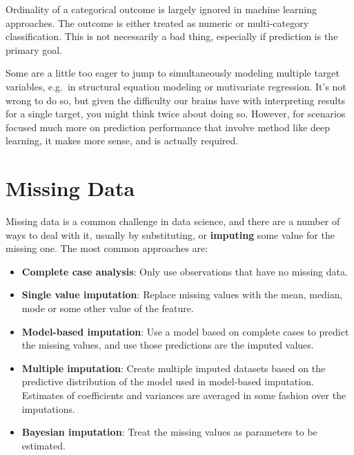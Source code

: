 \documentclass[
  letterpaper,
]{krantz}
\providecommand{\tightlist}{%
  \setlength{\itemsep}{0pt}\setlength{\parskip}{0pt}}\usepackage{longtable,booktabs,array}
\begin{document}
Ordinality of a categorical outcome is largely ignored in machine
learning approaches. The outcome is either treated as numeric or
multi-category classification. This is not necessarily a bad thing,
especially if prediction is the primary goal.

\begin{tcolorbox}[enhanced jigsaw, toprule=.15mm, colback=white, breakable, rightrule=.15mm, arc=.35mm, bottomrule=.15mm, opacityback=0, colframe=quarto-callout-tip-color-frame, leftrule=.75mm, left=2mm]
\begin{minipage}[t]{5.5mm}
\textcolor{quarto-callout-tip-color}{\faLightbulb}
\end{minipage}%
\begin{minipage}[t]{\textwidth - 5.5mm}

Some are a little too eager to jump to simultaneously modeling multiple
target variables, e.g.~in structural equation modeling or mutivariate
regression. It's not wrong to do so, but given the difficulty our brains
have with interpreting results for a single target, you might think
twice about doing so. However, for scenarios focused much more on
prediction performance that involve method like deep learning, it makes
more sense, and is actually required.

\end{minipage}%
\end{tcolorbox}

\section{Missing Data}\label{sec-missing-data}

Missing data is a common challenge in data science, and there are a
number of ways to deal with it, usually by substituting, or
\textbf{imputing} some value for the missing one. The most common
approaches are:

\begin{itemize}
\tightlist
\item
  \textbf{Complete case analysis}: Only use observations that have no
  missing data.
\item
  \textbf{Single value imputation}: Replace missing values with the
  mean, median, mode or some other value of the feature.
\item
  \textbf{Model-based imputation}: Use a model based on complete cases
  to predict the missing values, and use those predictions are the
  imputed values.
\item
  \textbf{Multiple imputation}: Create multiple imputed datasets based
  on the predictive distribution of the model used in model-based
  imputation. Estimates of coefficients and variances are averaged in
  some fashion over the imputations.
\item
  \textbf{Bayesian imputation}: Treat the missing values as parameters
  to be estimated.
\end{itemize}
\end{document}
